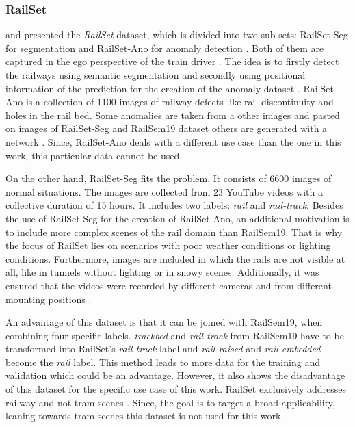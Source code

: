 \subsubsection{RailSet}
\label{subsubsec:RailSet}
\cite{railSet2022} and \cite{hadded2022application} presented the \textit{RailSet} dataset,
which is divided into two sub sets: RailSet-Seg for segmentation and RailSet-Ano for anomaly detection \cite{railSet2022}.
Both of them are captured in the ego perspective of the train driver \cite{railSet2022} \cite{hadded2022application}.
The idea is to firstly detect the railways using semantic segmentation and secondly using positional information of the prediction for the creation of the anomaly dataset \cite{railSet2022}.
RailSet-Ano is a collection of 1100 images of railway defects like rail discontinuity and holes in the rail bed.
Some anomalies are taken from a other images and pasted on images of RailSet-Seg and RailSem19 dataset others are generated with a network \cite{railSet2022}.
Since, RailSet-Ano deals with a different use case than the one in this work, this particular data cannot be used.

On the other hand, RailSet-Seg fits the problem. It consists of 6600 images of normal situations.
The images are collected from 23 YouTube videos with a collective duration of 15 hours. It includes two labels: \textit{rail} and \textit{rail-track}.
Besides the use of  RailSet-Seg for the creation of RailSet-Ano, an additional motivation is to include more complex scenes of the rail domain than RailSem19.
That is why the focus of RailSet lies on scenarios with poor weather conditions or lighting conditions.
Furthermore, images are included in which the rails are not visible at all, like in tunnels without lighting or in snowy scenes.
Additionally, it was ensured that the videos were recorded by different cameras and from different mounting positions \cite{railSet2022} \cite{hadded2022application}. 

An advantage of this dataset is that it can be joined with RailSem19, when combining four specific labels.
\textit{trackbed} and \textit{rail-track} from RailSem19 have to be transformed into RailSet's \textit{rail-track} label and \textit{rail-raised} and \textit{rail-embedded} become the \textit{rail} label.
This method leads to more data for the training and validation which could be an advantage.
However, it also shows the disadvantage of this dataset for the specific use case of this work. 
RailSet exclusively addresses railway and not tram scenes \cite{hadded2022application}.
Since, the goal is to target a broad applicability, leaning towards tram scenes this dataset is not used for this work.

